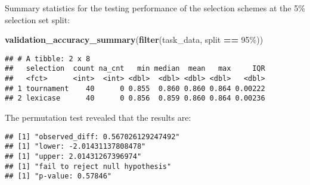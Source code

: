 \documentclass[
]{book}
\newenvironment{Shaded}{\begin{snugshade}}{\end{snugshade}}
\newcommand{\AttributeTok}[1]{\textcolor[rgb]{0.13,0.29,0.53}{#1}}
\newcommand{\DecValTok}[1]{\textcolor[rgb]{0.00,0.00,0.81}{#1}}
\newcommand{\FunctionTok}[1]{\textcolor[rgb]{0.13,0.29,0.53}{\textbf{#1}}}
\newcommand{\NormalTok}[1]{#1}
\newcommand{\OtherTok}[1]{\textcolor[rgb]{0.56,0.35,0.01}{#1}}
\newcommand{\SpecialCharTok}[1]{\textcolor[rgb]{0.81,0.36,0.00}{\textbf{#1}}}
\newcommand{\StringTok}[1]{\textcolor[rgb]{0.31,0.60,0.02}{#1}}
\begin{document}
Summary statistics for the testing performance of the selection schemes at the 5\% selection set split:

\begin{Shaded}
\begin{Highlighting}[]
\FunctionTok{validation\_accuracy\_summary}\NormalTok{(}\FunctionTok{filter}\NormalTok{(task\_data, split }\SpecialCharTok{==} \StringTok{\textquotesingle{}95\%\textquotesingle{}}\NormalTok{))}
\end{Highlighting}
\end{Shaded}

\begin{verbatim}
## # A tibble: 2 x 8
##   selection  count na_cnt   min median  mean   max     IQR
##   <fct>      <int>  <int> <dbl>  <dbl> <dbl> <dbl>   <dbl>
## 1 tournament    40      0 0.855  0.860 0.860 0.864 0.00222
## 2 lexicase      40      0 0.856  0.859 0.860 0.864 0.00236
\end{verbatim}

The permutation test revealed that the results are:

\begin{Shaded}
\end{Shaded}

\begin{verbatim}
## [1] "observed_diff: 0.567026129247492"
## [1] "lower: -2.01431137808478"
## [1] "upper: 2.01431267396974"
## [1] "fail to reject null hypothesis"
## [1] "p-value: 0.57846"
\end{verbatim}
\end{document}
